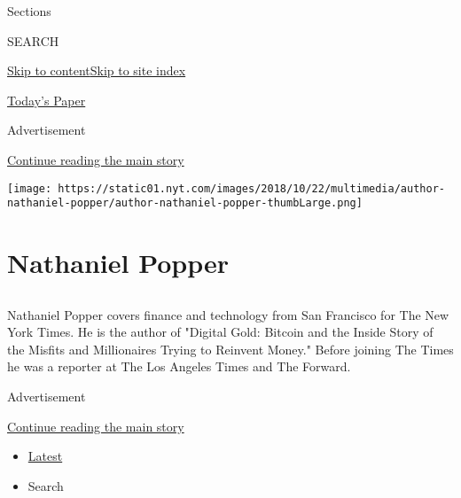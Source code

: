 Sections

SEARCH

\protect\hyperlink{site-content}{Skip to
content}\protect\hyperlink{site-index}{Skip to site index}

\href{https://myaccount.nytimes.com/auth/login?response_type=cookie\&client_id=vi}{}

\href{https://www.nytimes.com/section/todayspaper}{Today's Paper}

Advertisement

\protect\hyperlink{after-top}{Continue reading the main story}

\texttt{[image: https://static01.nyt.com/images/2018/10/22/multimedia/author-nathaniel-popper/author-nathaniel-popper-thumbLarge.png]}

\hypertarget{nathaniel-popper}{%
\section{Nathaniel Popper}\label{nathaniel-popper}}

\subsection{}

Nathaniel Popper covers finance and technology from San Francisco for
The New York Times. He is the author of "Digital Gold: Bitcoin and the
Inside Story of the Misfits and Millionaires Trying to Reinvent Money."
Before joining The Times he was a reporter at The Los Angeles Times and
The Forward.

Advertisement

\protect\hyperlink{after-mid1}{Continue reading the main story}

\begin{itemize}
\tightlist
\item
  \protect\hyperlink{stream-panel}{Latest}
\item
  Search
\end{itemize}

